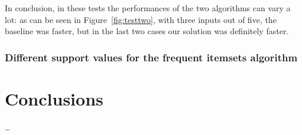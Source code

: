 \documentclass{acm_proc_article-sp-sigmod09}
\begin{document}
In conclusion, in these tests the performances of the two algorithms can vary a lot: as can be seen in Figure~\ref{fig:testtwo}, with three inputs out of five, the baseline was faster, but in the last two cases our solution was definitely faster.

\subsubsection{Different support values for the frequent itemsets algorithm}

\section{Conclusions}
\dots

%

\end{document}
